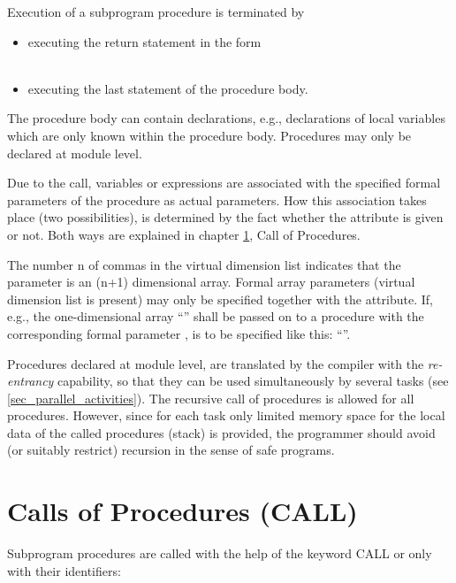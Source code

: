 Execution of a subprogram procedure is terminated by
\begin{itemize}
\item executing the return statement in the form\\
      \\
\item executing the last statement of the procedure body.
\end{itemize}

The procedure body can contain declarations, e.g., declarations of local
variables which are only known within the procedure body. 
Procedures may only be declared at module level.

Due to the call, variables or expressions are associated with the
specified formal parameters of the procedure as actual parameters. How
this association takes place (two possibilities), is determined by the
fact whether the attribute  is given or not. Both ways are
explained in chapter \ref{sec_call}, Call of Procedures.

The number n of commas in the virtual dimension list indicates that the
parameter is an (n+1) dimensional array. Formal array parameters
(virtual dimension list is present) may only be specified together with
the  attribute. If, e.g., the one-dimensional array 
``'' shall be passed on to a procedure 
 with the corresponding
formal parameter ,  is to be specified like this:
 ``''.

Procedures declared at module level, are translated by the compiler with
the {\em re-entrancy} capability, so that they can be used
simultaneously by several tasks (see \ref{sec_parallel_activities}).
 The recursive call of
procedures is allowed for all
procedures.
However, since for each task only limited memory space for the local
data of the called procedures (stack) is provided, the programmer
should avoid (or suitably restrict) recursion in the sense of safe
programs.

\section{Calls of Procedures (CALL)}   %
\label{sec_call}

Subprogram procedures are called with the help of the keyword CALL or
only with their identifiers:

\begin{grammarframe} 



\end{grammarframe} 

